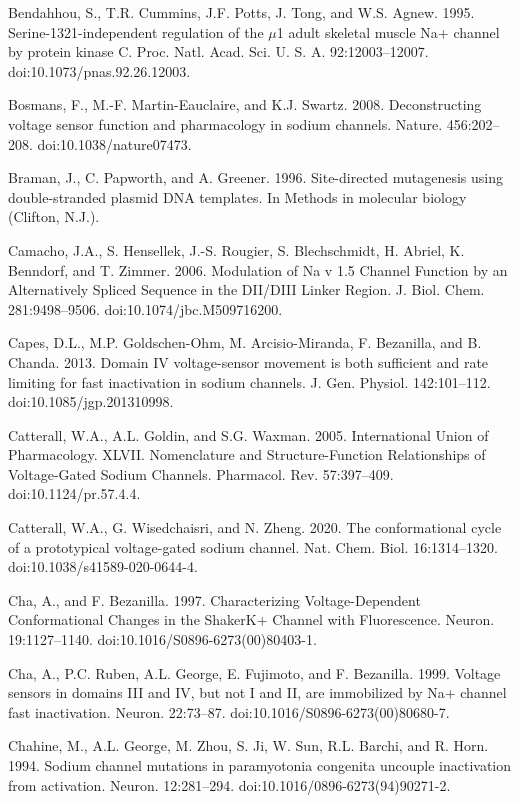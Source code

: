 \begin{hangparas}{.25in}{1}
Bendahhou, S., T.R. Cummins, J.F. Potts, J. Tong, and W.S. Agnew. 1995. Serine-1321-independent regulation of the $\mu$1 adult skeletal muscle Na+ channel by protein kinase C. Proc. Natl. Acad. Sci. U. S. A. 92:12003–12007. doi:10.1073/pnas.92.26.12003.

Bosmans, F., M.-F. Martin-Eauclaire, and K.J. Swartz. 2008. Deconstructing voltage sensor function and pharmacology in sodium channels. Nature. 456:202–208. doi:10.1038/nature07473.

Braman, J., C. Papworth, and A. Greener. 1996. Site-directed mutagenesis using double-stranded plasmid DNA templates. In Methods in molecular biology (Clifton, N.J.).

Camacho, J.A., S. Hensellek, J.-S. Rougier, S. Blechschmidt, H. Abriel, K. Benndorf, and T. Zimmer. 2006. Modulation of Na v 1.5 Channel Function by an Alternatively Spliced Sequence in the DII/DIII Linker Region. J. Biol. Chem. 281:9498–9506. doi:10.1074/jbc.M509716200.

Capes, D.L., M.P. Goldschen-Ohm, M. Arcisio-Miranda, F. Bezanilla, and B. Chanda. 2013. Domain IV voltage-sensor movement is both sufficient and rate limiting for fast inactivation in sodium channels. J. Gen. Physiol. 142:101–112. doi:10.1085/jgp.201310998.

Catterall, W.A., A.L. Goldin, and S.G. Waxman. 2005. International Union of Pharmacology. XLVII. Nomenclature and Structure-Function Relationships of Voltage-Gated Sodium Channels. Pharmacol. Rev. 57:397–409. doi:10.1124/pr.57.4.4.

Catterall, W.A., G. Wisedchaisri, and N. Zheng. 2020. The conformational cycle of a prototypical voltage-gated sodium channel. Nat. Chem. Biol. 16:1314–1320. doi:10.1038/s41589-020-0644-4.

Cha, A., and F. Bezanilla. 1997. Characterizing Voltage-Dependent Conformational Changes in the ShakerK+ Channel with Fluorescence. Neuron. 19:1127–1140. doi:10.1016/S0896-6273(00)80403-1.

Cha, A., P.C. Ruben, A.L. George, E. Fujimoto, and F. Bezanilla. 1999. Voltage sensors in domains III and IV, but not I and II, are immobilized by Na+ channel fast inactivation. Neuron. 22:73–87. doi:10.1016/S0896-6273(00)80680-7.

Chahine, M., A.L. George, M. Zhou, S. Ji, W. Sun, R.L. Barchi, and R. Horn. 1994. Sodium channel mutations in paramyotonia congenita uncouple inactivation from activation. Neuron. 12:281–294. doi:10.1016/0896-6273(94)90271-2.


\end{hangparas}
